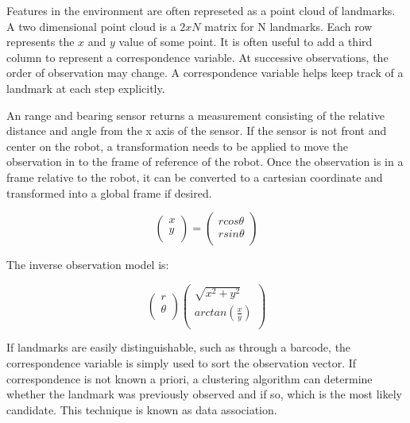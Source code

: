 \documentclass[12pt]{report}
\begin{document}
Features in the environment are often represeted as a point cloud of
landmarks. A two dimensional point cloud is a $2xN$ matrix for N
landmarks. Each row represents the $x$ and $y$ value of some point. It
is often useful to add a third column to represent a correspondence
variable.  At successive observations, the order of observation may
change. A correspondence variable helps keep track of a landmark at
each step explicitly.

An range and bearing sensor returns a measurement consisting of the
relative distance and angle from the x axis of the sensor. If the
sensor is not front and center on the robot, a transformation needs to
be applied to move the observation in to the frame of reference of the
robot. Once the observation is in a frame relative to the robot, it
can be converted to a cartesian coordinate and transformed into a
global frame if desired.

\begin{equation}\label{pol2cart}
\begin{pmatrix}
 x \\ y \\
\end{pmatrix} =
\begin{pmatrix}
 r cos \theta \\ r sin \theta \\
\end{pmatrix}
\end{equation}

The inverse observation model is:

\begin{equation}\label{cart2pol}
\begin{pmatrix}
 r \\ \theta \\
\end{pmatrix}
\begin{pmatrix}
 \sqrt{x^2 + y^2} \\ arctan(\frac{x}{y}) \\
\end{pmatrix}
\end{equation}


If landmarks are easily distinguishable, such as through a barcode,
the correspondence variable is simply used to sort the observation
vector. If correspondence is not known a priori, a clustering
algorithm can determine whether the landmark was previously observed
and if so, which is the most likely candidate. This technique is known
as data association.
\end{document}

